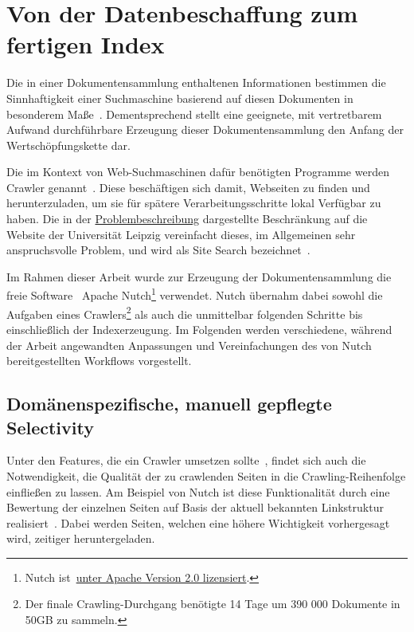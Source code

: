 \section{Von der Datenbeschaffung zum fertigen Index}
\label{chap:data_aqcuisition}

Die in einer Dokumentensammlung enthaltenen Informationen bestimmen die Sinnhaftigkeit
einer Suchmaschine basierend auf diesen Dokumenten in besonderem Maße~\cite{croft.chap3}.
Dementsprechend stellt eine geeignete, mit vertretbarem Aufwand durchführbare
Erzeugung dieser Dokumentensammlung den Anfang der Wertschöpfungskette dar.

Die im Kontext von Web-Suchmaschinen dafür benötigten Programme werden Crawler genannt~\cite{croft.chap3}.
Diese beschäftigen sich damit, Webseiten zu finden und herunterzuladen, um sie für spätere Verarbeitungsschritte lokal Verfügbar zu haben.
Die in der \hyperref[sec:intro]{Problembeschreibung} dargestellte Beschränkung auf die Website der Universität Leipzig
vereinfacht dieses, im Allgemeinen sehr anspruchsvolle Problem, und wird als Site Search bezeichnet~\cite{croft.chap2}.

Im Rahmen dieser Arbeit wurde zur Erzeugung der Dokumentensammlung die freie Software~\cite{wiki.free_license}
Apache Nutch\footnote{Nutch ist~\href{https://github.com/apache/nutch/blob/master/LICENSE.txt}{unter Apache Version 2.0 lizensiert}.}
verwendet.
Nutch übernahm dabei sowohl die Aufgaben eines Crawlers\footnote{Der finale Crawling-Durchgang benötigte 14 Tage um 390 000 Dokumente in 50GB zu sammeln.}
als auch die unmittelbar folgenden Schritte bis einschließlich der Indexerzeugung.
Im Folgenden werden verschiedene, während der Arbeit angewandten Anpassungen und Vereinfachungen des von Nutch bereitgestellten
Workflows vorgestellt.
 
\subsection{Domänenspezifische, manuell gepflegte Selectivity}
Unter den Features, die ein Crawler umsetzen sollte~\cite{manning.chap20},
findet sich auch die Notwendigkeit, die Qualität der zu crawlenden Seiten
in die Crawling-Reihenfolge einfließen zu lassen.
Am Beispiel von Nutch ist diese Funktionalität durch eine Bewertung der einzelnen Seiten
auf Basis der aktuell bekannten Linkstruktur realisiert~\cite{nutch.invert_links}.
Dabei werden Seiten, welchen eine höhere Wichtigkeit vorhergesagt wird, zeitiger heruntergeladen.

